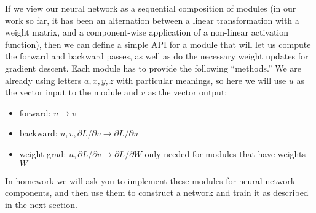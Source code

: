 If we view our neural network as a sequential composition of modules
(in our work so far, it has been an alternation between a linear
transformation with a weight matrix, and a component-wise application
of a non-linear activation function), then we can define a simple API
for a module that will let us compute the forward and backward passes,
as well as do the necessary weight updates for gradient descent.  Each
module has to provide the following ``methods.''  We are already using
letters $a, x, y, z$ with particular meanings, so here we will use $u$
as the vector input to the module and $v$ as the vector output:
\begin{itemize}
  \item forward: $u \rightarrow v$
  \item backward: $u, v, \partial L /
          \partial v \rightarrow \partial L / \partial u$
  \item weight grad: $u, \partial L / \partial v \rightarrow \partial L
          / \partial W$  only needed for modules that have weights $W$
\end{itemize}
In homework we will ask you to implement these modules for neural
network components, and then use them to construct a network and train
it as described in the next section.





